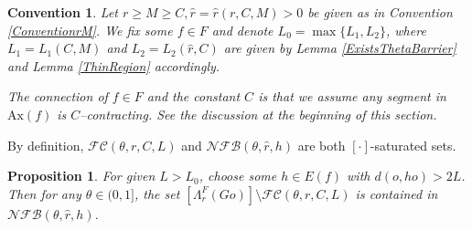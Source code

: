 \documentclass{amsart}
\newtheorem{prop}[thm]{Proposition}
\newtheorem{conv}[thm]{Convention}
\theoremstyle{definition}
\theoremstyle{remark}
\newcommand{\ax}{\mathrm{Ax}}
\begin{document}

\begin{conv}  \label{ConventionfLh}
Let $r\ge M\ge C, \hat r=\hat r(r,C,M)>0$ be given as in Convention \ref{ConventionrM}. We fix some $f\in F$ and denote  $L_0=\max\{L_1,L_2\}$, where $L_1=L_1(C,M)$ and $L_2=L_2(\hat r,C)$ are given by Lemma \ref{ExistsThetaBarrier} and Lemma \ref{ThinRegion} accordingly.  
 
The connection of $f\in F$ and the constant  $C$ is that we assume any segment in $\ax(f)$ is  $C$--contracting. See the discussion at the beginning of this section.
\end{conv}
By definition, $\mathcal{FC}(\theta, r, C,L)$ and  $\mathcal{NFB}(\theta,\hat r, h)$ are both $[\cdot]$-saturated sets.
\begin{prop}\label{keylemma}
For given $L>L_0$, choose  some $h\in E(f)$ with  $d(o,ho)>2L$. Then for any $\theta\in (0,1]$,  the  set   $[\Lambda_r^F(Go)]\setminus \mathcal{FC}(\theta, r, C,L)$  is contained in   $\mathcal{NFB}(\theta,\hat r, h)$.    
\end{prop}  
\end{document}
